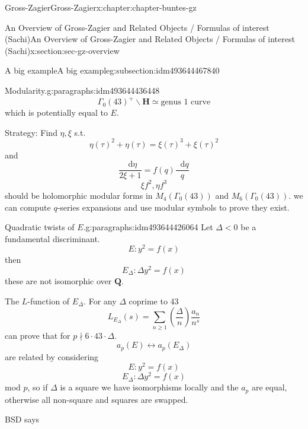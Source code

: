 \documentclass[oneside,10pt,]{book}
\numberwithin{equation}{section}
\newcommand{\diff}{\mathop{}\!\mathrm{d}}
\newcommand{\legendre}[2]{\left(\frac{#1}{#2}\right)}
\newcommand{\QQ}{\mathbf{Q}}
\newcommand{\HH}{\mathbf{H}}
\newcommand{\lt}{<}
\begin{document}
\begin{chapterptx}{Gross-Zagier}{}{Gross-Zagier}{}{}{x:chapter:chapter-buntes-gz}
\begin{sectionptx}{An Overview of Gross-Zagier and Related Objects \slash{} Formulas of interest (Sachi)}{}{An Overview of Gross-Zagier and Related Objects \slash{} Formulas of interest (Sachi)}{}{}{x:section:sec-gz-overview}
\begin{subsectionptx}{A big example}{}{A big example}{}{}{g:subsection:idm493644467840}
\begin{paragraphs}{Modularity.}{g:paragraphs:idm493644436448}
\begin{equation*}
\end{equation*}
%
\begin{equation*}
\Gamma _0(43)^+ \backslash \HH \simeq \text{genus 1 curve}
\end{equation*}
which is potentially equal to \(E\).%
\par
Strategy: Find \(\eta ,\xi \) s.t.%
\begin{equation*}
\eta(\tau )^2 + \eta(\tau ) = \xi (\tau )^3 + \xi (\tau )^2
\end{equation*}
and%
\begin{equation*}
\frac{\diff \eta}{2\xi  + 1} = f(q) \frac{\diff q}{q}
\end{equation*}
%
\begin{equation*}
\xi f^2, \eta f^3
\end{equation*}
should be holomorphic modular forms in \(M_4(\Gamma _0(43))\) and \(M_6(\Gamma _0(43))\). we can compute \(q\)-series expansions and use modular symbols to prove they exist.%
\end{paragraphs}%
\begin{paragraphs}{Quadratic twists of \(E\).}{g:paragraphs:idm493644426064}%
Let \(\Delta \lt  0\) be a fundamental discriminant.%
\begin{equation*}
E\colon y^2 = f(x)
\end{equation*}
then%
\begin{equation*}
E_{\Delta }\colon \Delta y^2 = f(x)
\end{equation*}
these are not isomorphic over \(\QQ\).%
\par
The \(L\)-function of \(E_\Delta \). For any \(\Delta \) coprime to 43%
\begin{equation*}
L_{E_\Delta } (s) = \sum_{n\ge 1} \legendre \Delta  n \frac{a_n}{n^s}
\end{equation*}
can prove that for \(p\nmid 6\cdot 43 \cdot \Delta \).%
\begin{equation*}
a_p(E) \leftrightarrow a_p(E_\Delta )
\end{equation*}
are related by considering%
\begin{equation*}
E\colon  y^2 = f(x)
\end{equation*}
%
\begin{equation*}
E_\Delta \colon  \Delta y^2= f(x)
\end{equation*}
mod \(p\), so if \(\Delta \) is a square we have isomorphisms locally and the \(a_p\) are equal, otherwise all non-square and squares are swapped.%
\par
BSD says%
\begin{equation*}

\end{equation*}
\end{paragraphs}
\end{subsectionptx}
\end{sectionptx}
\end{chapterptx}
\end{document}
